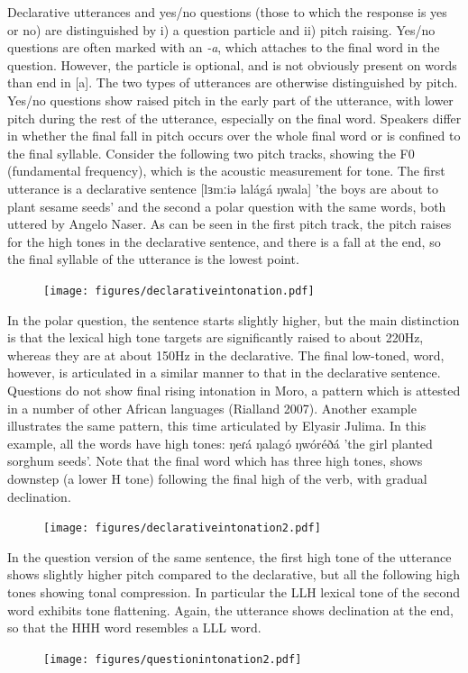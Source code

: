 Declarative utterances and yes/no questions (those to which the response is yes or no) are distinguished by i) a question particle and ii)  pitch raising. Yes/no questions are often marked with an \textit{-a}, which attaches to the final word in the question. However, the particle is optional, and is not obviously present on words than end in [a]. The two types of utterances are otherwise distinguished by pitch. Yes/no questions show raised pitch in the early part of the utterance, with lower pitch during the rest of the utterance, especially on the final word. Speakers differ in whether the final fall in pitch occurs over the whole final word or is confined to the final syllable. 
Consider the following two pitch tracks, showing the F0 (fundamental frequency), which is the acoustic measurement for tone. The first utterance is a declarative sentence [lɜmːiə lalágá ŋwala] 'the boys are about to plant sesame seeds' and the second a polar question with the same words, both uttered by Angelo Naser. As can be seen in the first pitch track, the pitch raises for the high tones in the declarative sentence, and there is a fall at the end, so the final syllable of the utterance is the lowest point. \begin{figure}
  \texttt{[image: figures/declarativeintonation.pdf]}
    \label{fig:4-4}
\end{figure}

In the polar question, the sentence starts slightly higher, but the main distinction is that the lexical high tone targets are significantly raised to about 220Hz, whereas they are at about 150Hz in the declarative. The final low-toned, word, however, is articulated in a similar manner to that in the declarative sentence. Questions do not show final rising intonation in Moro, a pattern which is attested in a number of other African languages (Rialland 2007). 
Another example illustrates the same pattern, this time articulated by Elyasir Julima. In this example, all the words have high tones: ŋeɾá ŋalagó ŋwóréðá 'the girl planted sorghum seeds'. Note that the final word which has three high tones, shows downstep (a lower H tone) following the final high of the verb, with gradual declination. 

\begin{figure}
  \texttt{[image: figures/declarativeintonation2.pdf]}
\label{fig:4-4}
\end{figure}

In the question version of the same sentence, the first high tone of the utterance shows slightly higher pitch  compared to the declarative, but all the following high tones showing tonal compression. In particular the LLH lexical tone of the second word exhibits tone flattening. Again, the utterance shows declination at the end, so that the HHH word resembles a LLL word. 
\begin{figure}
  \texttt{[image: figures/questionintonation2.pdf]}
\label{fig:4-4}
\end{figure}


